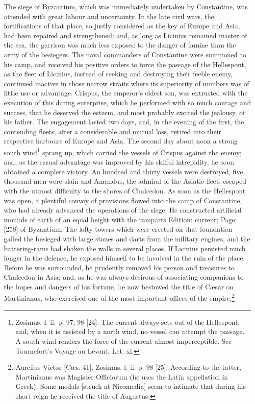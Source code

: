 The siege of Byzantium, which was immediately undertaken by Constantine, was attended with great labour and uncertainty. In the late civil wars, the fortifications of that place, so justly considered as the key of Europe and Asia, had been repaired and strengthened; and, as long as Licinius remained master of the sea, the garrison was much less exposed to the danger of famine than the army of the besiegers. The naval commanders of Constantine were summoned to his camp, and received his positive orders to force the passage of the Hellespont, as the fleet of Licinius, instead of seeking and destroying their feeble enemy, continued inactive in those narrow straits where its superiority of numbers was of little use or advantage. Crispus, the emperor\texthebrew{}’s eldest son, was entrusted with the execution of this daring enterprise, which he performed with so much courage and success, that he deserved the esteem, and most probably excited the jealousy, of his father. The engagement lasted two days, and, in the evening of the first, the contending fleets, after a considerable and mutual loss, retired into their respective harbours of Europe and Asia. The second day about noon a strong south wind\footnote{Zosimus, l. ii. p. 97, 98 [24]. The current always sets out of the Hellespont; and, when it is assisted by a north wind, no vessel can attempt the passage. A south wind renders the force of the current almost imperceptible. See Tournefort\texthebrew{}’s Voyage au Levant, Let. xi.} sprang up, which carried the vessels of Crispus against the enemy; and, as the casual advantage was improved by his skilful intrepidity, he soon obtained a complete victory. An hundred and thirty vessels were destroyed, five thousand men were slain and Amandus, the admiral of the Asiatic fleet, escaped with the utmost difficulty to the shores of Chalcedon. As soon as the Hellespont was open, a plentiful convoy of provisions flowed into the camp of Constantine, who had already advanced the operations of the siege. He constructed artificial mounds of earth of an equal height with the ramparts Edition: current; Page: [258] of Byzantium. The lofty towers which were erected on that foundation galled the besieged with large stones and darts from the military engines, and the battering-rams had shaken the walls in several places. If Licinius persisted much longer in the defence, he exposed himself to be involved in the ruin of the place. Before he was surrounded, he prudently removed his person and treasures to Chalcedon in Asia; and, as he was always desirous of associating companions to the hopes and dangers of his fortune, he now bestowed the title of Cæsar on Martinianus, who exercised one of the most important offices of the empire.\footnote{Aurelius Victor [Cæs. 41]. Zosimus, l. ii. p. 98 [25]. According to the latter, Martinianus was Magister Officiorum (he uses the Latin appellation in Greek). Some medals [struck at Nicomedia] seem to intimate that during his short reign he received the title of Augustus.}


